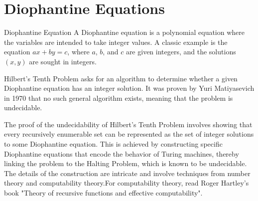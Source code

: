 \documentclass[openany]{book}
\begin{document}
\section{Diophantine Equations}
\begin{mydefinition}{Diophantine Equation}
A Diophantine equation is a polynomial equation where the variables are intended to take integer values. A classic example is the equation $ax + by = c$, where $a$, $b$, and $c$ are given integers, and the solutions $(x, y)$ are sought in integers.
\end{mydefinition}
\begin{mytheorem}
Hilbert's Tenth Problem asks for an algorithm to determine whether a given Diophantine equation has an integer solution. It was proven by Yuri Matiyasevich in 1970 that no such general algorithm exists, meaning that the problem is undecidable.
\end{mytheorem}
The proof of the undecidability of Hilbert's Tenth Problem involves showing that every recursively enumerable set can be represented as the set of integer solutions to some Diophantine equation. This is achieved by constructing specific Diophantine equations that encode the behavior of Turing machines, thereby linking the problem to the Halting Problem, which is known to be undecidable. The details of the construction are intricate and involve techniques from number theory and computability theory.For computability theory, read Roger Hartley's book "Theory of recursive functions and effective computability".
\end{document}
